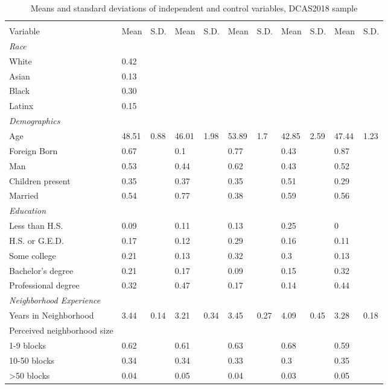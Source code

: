 % 
\begin{sidewaystable}[ht]
\centering
\caption{Means and standard deviations of independent and control variables, DCAS2018 sample} 
\label{descriptives18}
\begin{tabular}{lR{.4in}R{.4in}R{.4in}R{.4in}R{.4in}R{.4in}R{.4in}R{.4in}R{.4in}R{.4in}}
  \toprule
&  &  &  &  &  \\
Variable & Mean & S.D. & Mean & S.D. & Mean & S.D. & Mean & S.D. & Mean & S.D. \\ 
  \midrule
\emph{Race}&&\\White &  0.42 &  &  &  &  &  &  &  &  &  \\ 
  Asian &  0.13 &  &  &  &  &  &  &  &  &  \\ 
  Black &  0.30 &  &  &  &  &  &  &  &  &  \\ 
  Latinx\vspace{1em} &  0.15 &  &  &  &  &  &  &  &  &  \\ 
  \emph{Demographics}&&\\Age & 48.51 & 0.88 & 46.01 & 1.98 & 53.89 & 1.7 & 42.85 & 2.59 & 47.44 & 1.23 \\ 
  Foreign Born &  0.67 &  & 0.1 &  & 0.77 &  & 0.43 &  & 0.87 &  \\ 
  Man &  0.53 &  & 0.44 &  & 0.62 &  & 0.43 &  & 0.52 &  \\ 
  Children present &  0.35 &  & 0.37 &  & 0.35 &  & 0.51 &  & 0.29 &  \\ 
  Married\vspace{1em} &  0.54 &  & 0.77 &  & 0.38 &  & 0.59 &  & 0.56 &  \\ 
  \emph{Education}&&\\Less than H.S. &  0.09 &  & 0.11 &  & 0.13 &  & 0.25 &  & 0 &  \\ 
  H.S. or G.E.D. &  0.17 &  & 0.12 &  & 0.29 &  & 0.16 &  & 0.11 &  \\ 
  Some college &  0.21 &  & 0.13 &  & 0.32 &  & 0.3 &  & 0.13 &  \\ 
  Bachelor's degree &  0.21 &  & 0.17 &  & 0.09 &  & 0.15 &  & 0.32 &  \\ 
  Professional degree\vspace{1em} &  0.32 &  & 0.47 &  & 0.17 &  & 0.14 &  & 0.44 &  \\ 
  \emph{Neighborhood Experience}\\Years in Neighborhood &  3.44 & 0.14 & 3.21 & 0.34 & 3.45 & 0.27 & 4.09 & 0.45 & 3.28 & 0.18 \\ 
  Perceived neighborhood size\\1-9 blocks &  0.62 &  & 0.61 &  & 0.63 &  & 0.68 &  & 0.59 &  \\ 
  10-50 blocks &  0.34 &  & 0.34 &  & 0.33 &  & 0.3 &  & 0.35 &  \\ 
  >50 blocks &  0.04 &  & 0.05 &  & 0.04 &  & 0.03 &  & 0.05 &  \\ 
   \bottomrule
\end{tabular}
\end{sidewaystable}
